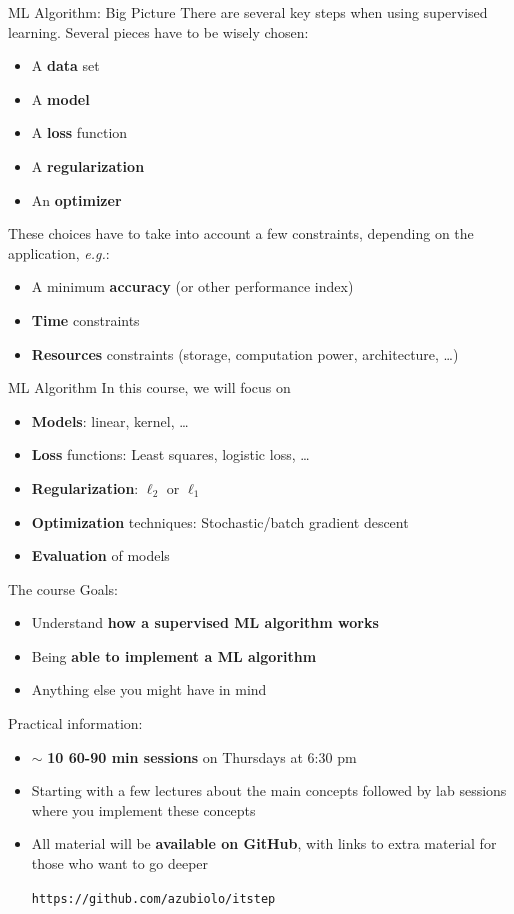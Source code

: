\documentclass{beamer}
\begin{document}
\begin{frame}{ML Algorithm: Big Picture}
There are several key steps when using supervised learning. Several pieces have to be wisely chosen:
\begin{itemize}
	\item A \textbf{data} set
	\item A \textbf{model}
	\item A \textbf{loss} function
	\item A \textbf{regularization}
	\item An \textbf{optimizer}
\end{itemize}
\vfill
\pause
These choices have to take into account a few constraints, depending on the application, \textit{e.g.}:
\begin{itemize}
	\item A minimum \textbf{accuracy} (or other performance index)
	\item \textbf{Time} constraints 
	\item \textbf{Resources} constraints (storage, computation power, architecture, \ldots)
\end{itemize}
\end{frame}

\begin{frame}{ML Algorithm}
In this course, we will focus on 
\begin{itemize}
	\item \textbf{Models}: linear, kernel, \ldots
	\item \textbf{Loss} functions: Least squares, logistic loss, \ldots
	\item \textbf{Regularization}: $\ell_2$ or $\ell_1$
	\item \textbf{Optimization} techniques: Stochastic/batch gradient descent
	\item \textbf{Evaluation} of models
\end{itemize}
\end{frame}

\begin{frame}{The course}
Goals:
\begin{itemize}
	\item Understand \textbf{how a supervised ML algorithm works}
	\item Being \textbf{able to implement a ML algorithm}
	\item Anything else you might have in mind
\end{itemize}
\vfill
\pause 
Practical information:
\begin{itemize}
	\item $\sim$ \textbf{10 60-90 min sessions} on Thursdays at 6:30 pm
	\item Starting with a few lectures about the main concepts followed by lab sessions where you implement these concepts
	\item All material will be \textbf{available on GitHub}, with links to extra material for those who want to go deeper
	\vfill
	\begin{center}
	\texttt{https://github.com/azubiolo/itstep}
	\end{center}
	\vfill
\end{itemize}
\end{frame}
\end{document}
